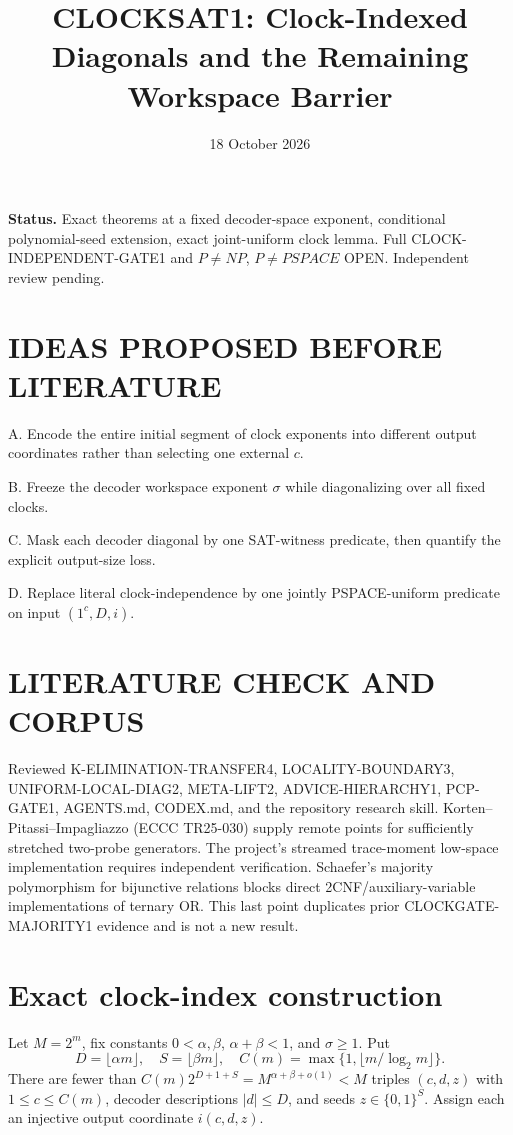 \documentclass[11pt]{article}
\title{CLOCKSAT1: Clock-Indexed Diagonals and the Remaining Workspace Barrier}
\date{18 October 2026}
\begin{document}
\maketitle
\noindent\textbf{Status.} Exact theorems at a fixed decoder-space exponent,
conditional polynomial-seed extension, exact joint-uniform clock lemma.
Full CLOCK-INDEPENDENT-GATE1 and \(P\ne NP\), \(P\ne PSPACE\) OPEN.
Independent review pending.

\section{IDEAS PROPOSED BEFORE LITERATURE}
\item[] A. Encode the entire initial segment of clock exponents into
different output coordinates rather than selecting one external \(c\).
\item[] B. Freeze the decoder workspace exponent \(\sigma\) while
diagonalizing over all fixed clocks.
\item[] C. Mask each decoder diagonal by one SAT-witness predicate,
then quantify the explicit output-size loss.
\item[] D. Replace literal clock-independence by one
jointly PSPACE-uniform predicate on input \((1^c,D,i)\).

\section{LITERATURE CHECK AND CORPUS}
Reviewed K-ELIMINATION-TRANSFER4, LOCALITY-BOUNDARY3,
UNIFORM-LOCAL-DIAG2, META-LIFT2, ADVICE-HIERARCHY1, PCP-GATE1,
AGENTS.md, CODEX.md, and the repository research skill.
Korten--Pitassi--Impagliazzo (ECCC TR25-030) supply remote
points for sufficiently stretched two-probe generators.
The project's streamed trace-moment low-space implementation
requires independent verification. Schaefer's majority polymorphism
for bijunctive relations blocks direct 2CNF/auxiliary-variable
implementations of ternary OR. This last point duplicates prior
CLOCKGATE-MAJORITY1 evidence and is not a new result.

\section{Exact clock-index construction}
Let \(M=2^m\), fix constants
\(0<\alpha,\beta\), \(\alpha+\beta<1\), and \(\sigma\ge1\).
Put
\[
D=\lfloor\alpha m\rfloor,\quad
S=\lfloor\beta m\rfloor,\quad
C(m)=\max\{1,\lfloor m/\log_2m\rfloor\}.
\]
There are fewer than
\(C(m)2^{D+1+S}=M^{\alpha+\beta+o(1)}<M\)
triples \((c,d,z)\) with \(1\le c\le C(m)\),
decoder descriptions \(|d|\le D\),
and seeds \(z\in\{0,1\}^S\).
Assign each an injective output coordinate \(i(c,d,z)\).
\end{document}
